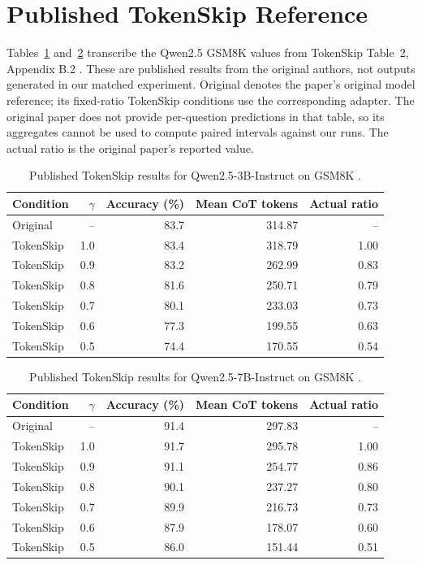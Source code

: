 \documentclass[a4paper,runningheads]{llncs}
\begin{document}


\section{Published TokenSkip Reference}
Tables~\ref{tab:published3b} and~\ref{tab:published7b} transcribe the Qwen2.5 GSM8K values from TokenSkip Table~2, Appendix B.2 \cite{tokenskip}. These are published results from the original authors, not outputs generated in our matched experiment. Original denotes the paper's original model reference; its fixed-ratio TokenSkip conditions use the corresponding adapter. The original paper does not provide per-question predictions in that table, so its aggregates cannot be used to compute paired intervals against our runs. The actual ratio is the original paper's reported value.

\begin{table}[H]\centering\small
\caption{Published TokenSkip results for Qwen2.5-3B-Instruct on GSM8K \cite{tokenskip}.}
\label{tab:published3b}
\begin{tabular}{lrrrr}\toprule
Condition & $\gamma$ & Accuracy (\%) & Mean CoT tokens & Actual ratio\\\midrule
Original & -- & 83.7 & 314.87 & --\\
TokenSkip & 1.0 & 83.4 & 318.79 & 1.00\\
TokenSkip & 0.9 & 83.2 & 262.99 & 0.83\\
TokenSkip & 0.8 & 81.6 & 250.71 & 0.79\\
TokenSkip & 0.7 & 80.1 & 233.03 & 0.73\\
TokenSkip & 0.6 & 77.3 & 199.55 & 0.63\\
TokenSkip & 0.5 & 74.4 & 170.55 & 0.54\\
\bottomrule\end{tabular}\end{table}

\begin{table}[H]\centering\small
\caption{Published TokenSkip results for Qwen2.5-7B-Instruct on GSM8K \cite{tokenskip}.}
\label{tab:published7b}
\begin{tabular}{lrrrr}\toprule
Condition & $\gamma$ & Accuracy (\%) & Mean CoT tokens & Actual ratio\\\midrule
Original & -- & 91.4 & 297.83 & --\\
TokenSkip & 1.0 & 91.7 & 295.78 & 1.00\\
TokenSkip & 0.9 & 91.1 & 254.77 & 0.86\\
TokenSkip & 0.8 & 90.1 & 237.27 & 0.80\\
TokenSkip & 0.7 & 89.9 & 216.73 & 0.73\\
TokenSkip & 0.6 & 87.9 & 178.07 & 0.60\\
TokenSkip & 0.5 & 86.0 & 151.44 & 0.51\\
\bottomrule\end{tabular}\end{table}
\end{document}
